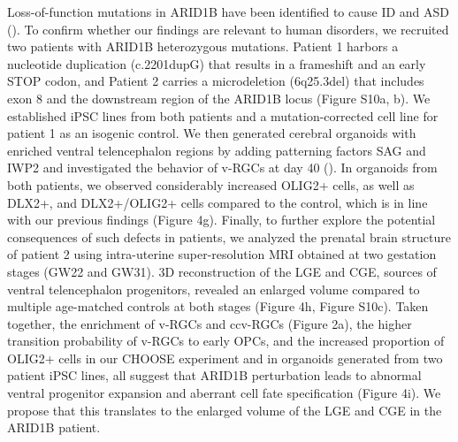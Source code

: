 Loss-of-function mutations in ARID1B have been identified to cause ID and ASD (\cite{moffat_neurobiology_2022,satterstrom_large-scale_2020}). To confirm whether our findings are relevant to human disorders, we recruited two patients with ARID1B heterozygous mutations. Patient 1 harbors a nucleotide duplication (c.2201dupG) that results in a frameshift and an early STOP codon, and Patient 2 carries a microdeletion (6q25.3del) that includes exon 8 and the downstream region of the ARID1B locus (Figure S10a, b). We established iPSC lines from both patients and a mutation-corrected cell line for patient 1 as an isogenic control. We then generated cerebral organoids with enriched ventral telencephalon regions by adding patterning factors SAG and IWP2 and investigated the behavior of v-RGCs at day 40 (\cite{bagley_fused_2017}). In organoids from both patients, we observed considerably increased OLIG2+ cells, as well as DLX2+, and DLX2+/OLIG2+ cells compared to the control, which is in line with our previous findings (Figure 4g). Finally, to further explore the potential consequences of such defects in patients, we analyzed the prenatal brain structure of patient 2 using intra-uterine super-resolution MRI obtained at two gestation stages (GW22 and GW31). 3D reconstruction of the LGE and CGE, sources of ventral telencephalon progenitors, revealed an enlarged volume compared to multiple age-matched controls at both stages (Figure 4h, Figure S10c). Taken together, the enrichment of v-RGCs and ccv-RGCs (Figure 2a), the higher transition probability of v-RGCs to early OPCs, and the increased proportion of OLIG2+ cells in our CHOOSE experiment and in organoids generated from two patient iPSC lines, all suggest that ARID1B perturbation leads to abnormal ventral progenitor expansion and aberrant cell fate specification (Figure 4i). We propose that this translates to the enlarged volume of the LGE and CGE in the ARID1B patient.


